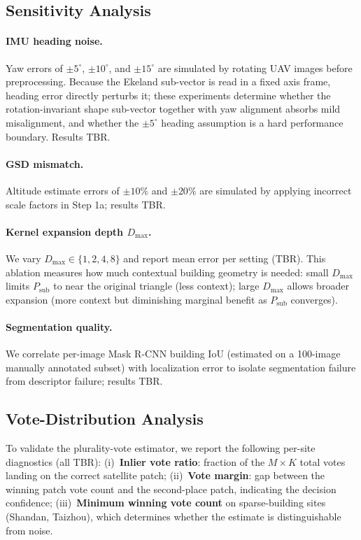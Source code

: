 \documentclass[10pt]{article}
\theoremstyle{plain}
\theoremstyle{definition}
\begin{document}
\subsection{Sensitivity Analysis}
\label{sec:sensitivity}

\paragraph{IMU heading noise.}
Yaw errors of $\pm5^\circ$, $\pm10^\circ$, and $\pm15^\circ$ are simulated
by rotating UAV images before preprocessing.
Because the Ekeland sub-vector is read in a fixed axis frame, heading error
directly perturbs it; these experiments determine whether the rotation-invariant
shape sub-vector together with yaw alignment absorbs mild misalignment, and
whether the $\pm5^\circ$ heading assumption is a hard performance boundary.
Results TBR.

\paragraph{GSD mismatch.}
Altitude estimate errors of $\pm10\%$ and $\pm20\%$ are simulated by
applying incorrect scale factors in Step 1a; results TBR.

\paragraph{Kernel expansion depth $D_{\max}$.}
We vary $D_{\max} \in \{1, 2, 4, 8\}$ and report mean error per setting (TBR).
This ablation measures how much contextual building geometry is needed: small
$D_{\max}$ limits $P_{\mathrm{sub}}$ to near the original triangle (less
context); large $D_{\max}$ allows broader expansion (more context but
diminishing marginal benefit as $P_{\mathrm{sub}}$ converges).

\paragraph{Segmentation quality.}
We correlate per-image Mask R-CNN building IoU (estimated on a 100-image
manually annotated subset) with localization error to isolate segmentation
failure from descriptor failure; results TBR.

\subsection{Vote-Distribution Analysis}

To validate the plurality-vote estimator, we report the following per-site
diagnostics (all TBR):
(i)~\textbf{Inlier vote ratio}: fraction of the $M \times K$ total votes
landing on the correct satellite patch;
(ii)~\textbf{Vote margin}: gap between the winning patch vote count and the
second-place patch, indicating the decision confidence;
(iii)~\textbf{Minimum winning vote count} on sparse-building sites (Shandan,
Taizhou), which determines whether the estimate is distinguishable from noise.
\end{document}
